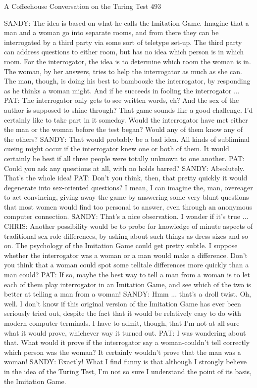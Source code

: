A Coffeehouse Conversation on the Turing Test                                      493

SANDY: The idea is based on what he calls the Imitation Game. Imagine that a man
   and a woman go into separate rooms, and from there they can be interrogated by
   a third party via some sort of teletype set-up. The third party can address
   questions to either room, but has no idea which person is in which room. For the
   interrogator, the idea is to determine which room the woman is in. The woman,
   by her answers, tries to help the interrogator as much as she can. The man,
   though, is doing his best to bamboozle the interrogator, by responding as he
   thinks a woman might. And if he succeeds in fooling the interrogator ...
PAT: The interrogator only gets to see written words, eh? And the sex of the author is
   supposed to shine through? That game sounds like a good challenge. I'd certainly
   like to take part in it someday. Would the interrogator have met either the man or
   the woman before the test began? Would any of them know any of the others?
SANDY: That would probably be a bad idea. All kinds of subliminal cueing might
   occur if the interrogator knew one or both of them. It would certainly be best if
   all three people were totally unknown to one another.
PAT: Could you ask any questions at all, with no holds barred?
SANDY: Absolutely. That's the whole idea!
PAT: Don't you think, then, that pretty quickly it would degenerate into sex-oriented
   questions? I mean, I can imagine the, man, overeager to act convincing, giving
   away the game by answering some very blunt questions that most women would
   find too personal to answer, even through an anonymous computer connection.
SANDY: That's a nice observation. I wonder if it's true ...
CHRIS: Another possibility would be to probe for knowledge of minute aspects of
   traditional sex-role differences, by asking about such things as dress sizes and so
   on. The psychology of the Imitation Game could get pretty subtle. I suppose
   whether the interrogator was a woman or a man would make a difference. Don't
   you think that a woman could spot some telltale differences more quickly than a
   man could?
PAT: If so, maybe the best way to tell a man from a woman is to let each of them play
   interrogator in an Imitation Game, and see which of the two is better at telling a
   man from a woman!
SANDY: Hmm ... that's a droll twist. Oh, well. I don't know if this original version of
   the Imitation Game has ever been seriously tried out, despite the fact that it
   would be relatively easy to do with modern computer terminals. I have to admit,
   though, that I'm not at all sure what it would prove, whichever way it turned out.
PAT: I was wondering about that. What would it prove if the interrogator say a
   woman-couldn't tell correctly which person was the woman? It certainly wouldn't
   prove that the man was a woman!
SANDY: Exactly! What I find funny is that although I strongly believe in the idea of
   the Turing Test, I'm not so sure I understand the point of its basis, the Imitation
   Game.




